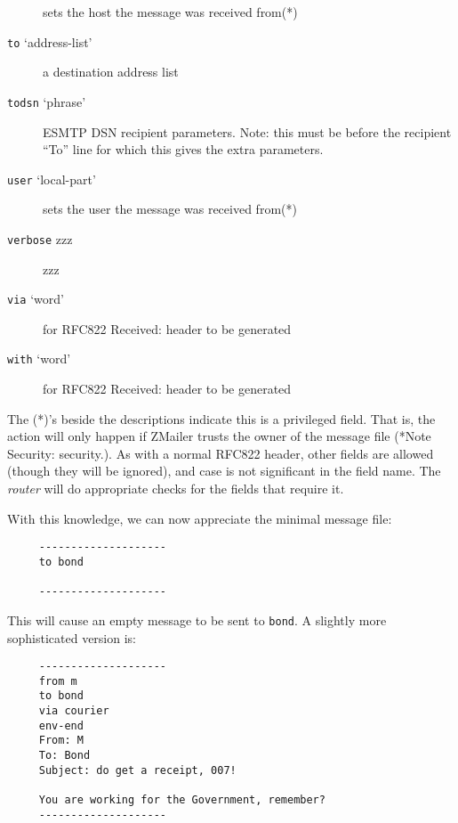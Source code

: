 \begin{description}
sets the host the message was received from(*)

\item[{\tt to} `address-list'] \mbox{}

a destination address list

\item[{\tt todsn} `phrase'] \mbox{}

ESMTP DSN recipient parameters. Note: this must be before the recipient ``To'' line for which this gives the extra parameters.

\item[{\tt user} `local-part'] \mbox{}

sets the user the message was received from(*)

\item[{\tt verbose} zzz] \mbox{}

zzz

\item[{\tt via} `word'] \mbox{}

for RFC822 Received: header to be generated

\item[{\tt with} `word'] \mbox{}

for RFC822 Received: header to be generated

\end{description}


The (*)'s beside the descriptions indicate this is a privileged field.
That is, the action will only happen if ZMailer trusts the owner of the
message file (*Note Security: security.).  As with a normal RFC822 header,
other fields are allowed (though they will be ignored), and case is not
significant in the field name.  The {\em router\/} will do appropriate checks for
the fields that require it.

With this knowledge, we can now appreciate the minimal message file:

\begin{tscreen}
\begin{verbatim}
     --------------------
     to bond
     
     --------------------
\end{verbatim}
\end{tscreen}


This will cause an empty message to be sent to {\tt bond}.  A slightly more
sophisticated version is:

\begin{tscreen}
\begin{verbatim}
     --------------------
     from m
     to bond
     via courier
     env-end
     From: M
     To: Bond
     Subject: do get a receipt, 007!
     
     You are working for the Government, remember?
     --------------------
\end{verbatim}
\end{tscreen}


